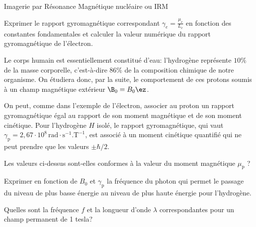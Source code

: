 \begin{exo}[PC][1][devoir]{Imagerie par Résonance Magnétique nucléaire ou IRM}
\begin{quest}
	\item Exprimer le rapport gyromagnétique correspondant $\gamma_{e}=\frac{\mu_{e}}{L_{e}}$ en fonction des constantes fondamentales et calculer la valeur numérique du rapport gyromagnétique de l'électron.
\end{quest}
Le corps humain est essentiellement constitué d'eau: l'hydrogène représente $10 \%$ de la masse corporelle, c'est-à-dire $86 \%$ de la composition chimique de notre organisme. On étudiera donc, par la suite, le comportement de ces protons soumis à un champ magnétique extérieur $\B_0=B_0 \ez$.

On peut, comme dans l'exemple de l'électron, associer au proton un rapport gyromagnétique égal au rapport de son moment magnétique et de son moment cinétique. Pour l'hydrogène $H$ isolé, le rapport gyromagnétique, qui vaut $\gamma_{\mathrm{p}}=2,67 \cdot 10^{8}\,\mathrm{rad} \cdot \mathrm{s}^{-1} . \mathrm{T}^{-1}$, est associé à un moment cinétique quantifié qui ne peut prendre que les valeurs $\pm \hbar / 2$.

\begin{quest}
	\item Les valeurs ci-dessus sont-elles conformes à la valeur du moment magnétique $\mu_{\mathrm{p}}$ ?

	\item Exprimer en fonction de $B_0$ et $\gamma_{\mathrm{p}}$ la fréquence du photon qui permet le passage du niveau de plus basse énergie au niveau de plus haute énergie pour l'hydrogène.

	\item Quelles sont la fréquence $f$ et la longueur d'onde $\lambda$ correspondantes pour un champ permanent de 1 tesla?
\end{quest}

\end{exo}
